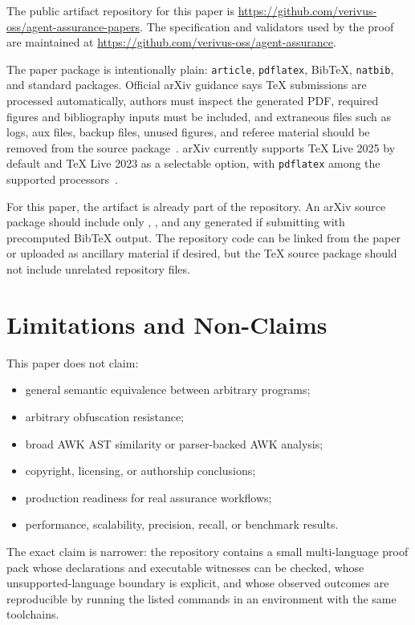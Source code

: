 \documentclass[11pt,letterpaper]{article}
\begin{document}
The public artifact repository for this paper is
\url{https://github.com/verivus-oss/agent-assurance-papers}. The
specification and validators used by the proof are maintained at
\url{https://github.com/verivus-oss/agent-assurance}.

The paper package is intentionally plain: \texttt{article},
\texttt{pdflatex}, BibTeX, \texttt{natbib}, and standard packages.
Official arXiv guidance says TeX submissions are processed
automatically, authors must inspect the generated PDF, required figures
and bibliography inputs must be included, and extraneous files such as
logs, aux files, backup files, unused figures, and referee material
should be removed from the source package~\cite{arxivSubmitTex2026}.
arXiv currently supports TeX Live 2025 by default and TeX Live 2023 as
a selectable option, with \texttt{pdflatex} among the supported
processors~\cite{arxivTexLive2026}.

For this paper, the artifact is already part of the repository. An
arXiv source package should include only ,
, and any generated  if submitting
with precomputed BibTeX output. The repository code can be linked from
the paper or uploaded as ancillary material if desired, but the TeX
source package should not include unrelated repository files.

\section{Limitations and Non-Claims}

This paper does not claim:

\begin{itemize}
  \item general semantic equivalence between arbitrary programs;
  \item arbitrary obfuscation resistance;
  \item broad AWK AST similarity or parser-backed AWK analysis;
  \item copyright, licensing, or authorship conclusions;
  \item production readiness for real assurance workflows;
  \item performance, scalability, precision, recall, or benchmark
        results.
\end{itemize}

The exact claim is narrower: the repository contains a small
multi-language proof pack whose declarations and executable witnesses
can be checked, whose unsupported-language boundary is explicit, and
whose observed outcomes are reproducible by running the listed commands
in an environment with the same toolchains.
\end{document}
